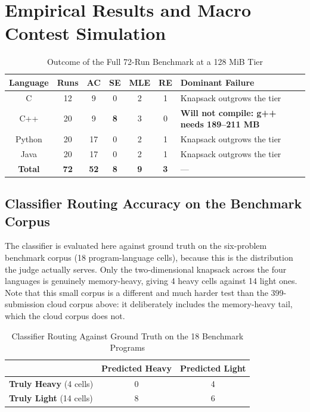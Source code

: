 \documentclass[conference]{IEEEtran}
\begin{document}
\section{Empirical Results and Macro Contest Simulation}

\begin{table}[!t]
\caption{Outcome of the Full 72-Run Benchmark at a 128 MiB Tier}
\label{tab:128mb_boundary}
\centering
\scriptsize
\begin{tabularx}{0.88\textwidth}{|c|c|c|c|c|c|Y|}
\hline
\textbf{Language} & \textbf{Runs} & \textbf{AC} & \textbf{SE} & \textbf{MLE} & \textbf{RE} & \textbf{Dominant Failure} \\
\hline
C & 12 & 9 & 0 & 2 & 1 & Knapsack outgrows the tier \\
\hline
C++ & 20 & 9 & \textbf{8} & 3 & 0 & \textbf{Will not compile: g++ needs 189--211 MB} \\
\hline
Python & 20 & 17 & 0 & 2 & 1 & Knapsack outgrows the tier \\
\hline
Java & 20 & 17 & 0 & 2 & 1 & Knapsack outgrows the tier \\
\hline
\textbf{Total} & \textbf{72} & \textbf{52} & \textbf{8} & \textbf{9} & \textbf{3} & --- \\
\hline
\end{tabularx}
\end{table}


\subsection{Classifier Routing Accuracy on the Benchmark Corpus}
\label{sec:classifier_eval}
The classifier is evaluated here against ground truth on the six-problem benchmark corpus (18 program-language cells), because this is the distribution the judge actually serves. Only the two-dimensional knapsack across the four languages is genuinely memory-heavy, giving 4 heavy cells against 14 light ones. Note that this small corpus is a different and much harder test than the 399-submission cloud corpus above: it deliberately includes the memory-heavy tail, which the cloud corpus does not.

\begin{table}[!t]
\caption{Classifier Routing Against Ground Truth on the 18 Benchmark Programs}
\label{tab:classifier_routing}
\centering
\scriptsize
\begin{tabular}{|l|c|c|}
\hline
& \textbf{Predicted Heavy} & \textbf{Predicted Light} \\
\hline
\textbf{Truly Heavy} (4 cells) & 0 & 4 \\
\hline
\textbf{Truly Light} (14 cells) & 8 & 6 \\
\hline
\end{tabular}
\end{table}
\end{document}
